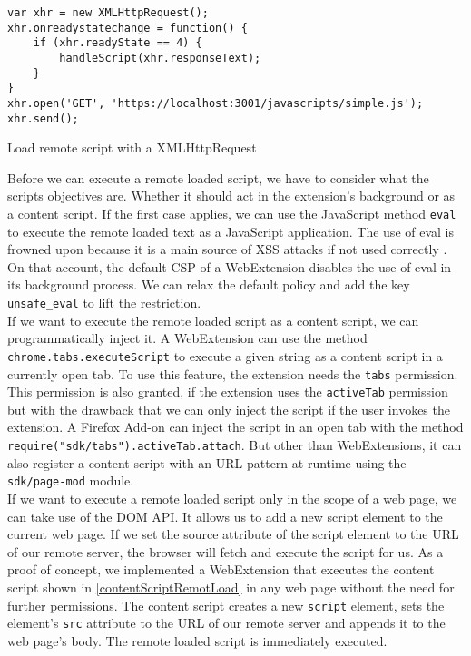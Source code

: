 			\begin{code}
				\begin{lstlisting}
var xhr = new XMLHttpRequest();
xhr.onreadystatechange = function() {
	if (xhr.readyState == 4) {
	    handleScript(xhr.responseText);
	}
}
xhr.open('GET', 'https://localhost:3001/javascripts/simple.js');
xhr.send();
\end{lstlisting}
				\caption{Load remote script with a XMLHttpRequest}
				\label{xhrLoadScript}
			\end{code}
			
			Before we can execute a remote loaded script, we have to consider what the scripts objectives are. Whether it should act in the extension's background or as a content script. If the first case applies, we can use the JavaScript method \texttt{eval} to execute the remote loaded text as a JavaScript application. The use of eval is frowned upon because it is a main source of XSS attacks if not used correctly \cite{mozillaDangerousEval}. On that account, the default CSP of a WebExtension disables the use of eval in its background process. We can relax the default policy and add the key \texttt{unsafe\_eval} to lift the restriction. \\
			
			If we want to execute the remote loaded script as a content script, we can programmatically inject it. A WebExtension can use the method \texttt{chrome.tabs.executeScript} to execute a given string as a content script in a currently open tab. To use this feature, the extension needs the \texttt{tabs} permission. This permission is also granted, if the extension uses the \texttt{activeTab} permission but with the drawback that we can only inject the script if the user invokes the extension. A Firefox Add-on can inject the script in an open tab with the method \texttt{require("sdk/tabs").activeTab.attach}. But other than WebExtensions, it can also register a content script with an URL pattern at runtime using the \texttt{sdk/page-mod} module. \\
			
			If we want to execute a remote loaded script only in the scope of a web page, we can take use of the DOM API. It allows us to add a new script element to the current web page. If we set the source attribute of the script element to the URL of our remote server, the browser will fetch and execute the script for us. As a proof of concept, we  implemented a WebExtension that executes the content script shown in \autoref{contentScriptRemotLoad} in any web page without the need for further permissions. The content script creates a new \texttt{script} element, sets the element's \texttt{src} attribute to the URL of our remote server and appends it to the web page's body. The remote loaded script is immediately executed.
			

